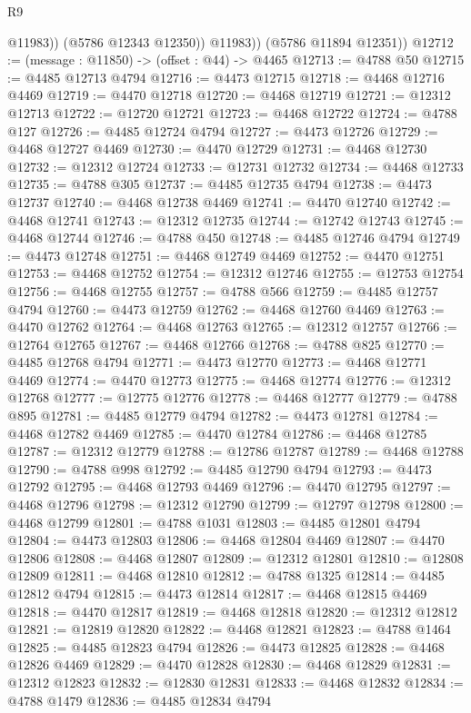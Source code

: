 \begin{lexlean}{R9}
\begin{coremodule}
                @11983))
            (@5786 @12343 @12350))
          @11983))
      (@5786 @11894 @12351))
@12712 := (message : @11850) -> (offset : @44) -> @4465
@12713 := @4788 @50
@12715 := @4485 @12713 @4794
@12716 := @4473 @12715
@12718 := @4468 @12716 @4469
@12719 := @4470 @12718
@12720 := @4468 @12719
@12721 := @12312 @12713
@12722 := @12720 @12721
@12723 := @4468 @12722
@12724 := @4788 @127
@12726 := @4485 @12724 @4794
@12727 := @4473 @12726
@12729 := @4468 @12727 @4469
@12730 := @4470 @12729
@12731 := @4468 @12730
@12732 := @12312 @12724
@12733 := @12731 @12732
@12734 := @4468 @12733
@12735 := @4788 @305
@12737 := @4485 @12735 @4794
@12738 := @4473 @12737
@12740 := @4468 @12738 @4469
@12741 := @4470 @12740
@12742 := @4468 @12741
@12743 := @12312 @12735
@12744 := @12742 @12743
@12745 := @4468 @12744
@12746 := @4788 @450
@12748 := @4485 @12746 @4794
@12749 := @4473 @12748
@12751 := @4468 @12749 @4469
@12752 := @4470 @12751
@12753 := @4468 @12752
@12754 := @12312 @12746
@12755 := @12753 @12754
@12756 := @4468 @12755
@12757 := @4788 @566
@12759 := @4485 @12757 @4794
@12760 := @4473 @12759
@12762 := @4468 @12760 @4469
@12763 := @4470 @12762
@12764 := @4468 @12763
@12765 := @12312 @12757
@12766 := @12764 @12765
@12767 := @4468 @12766
@12768 := @4788 @825
@12770 := @4485 @12768 @4794
@12771 := @4473 @12770
@12773 := @4468 @12771 @4469
@12774 := @4470 @12773
@12775 := @4468 @12774
@12776 := @12312 @12768
@12777 := @12775 @12776
@12778 := @4468 @12777
@12779 := @4788 @895
@12781 := @4485 @12779 @4794
@12782 := @4473 @12781
@12784 := @4468 @12782 @4469
@12785 := @4470 @12784
@12786 := @4468 @12785
@12787 := @12312 @12779
@12788 := @12786 @12787
@12789 := @4468 @12788
@12790 := @4788 @998
@12792 := @4485 @12790 @4794
@12793 := @4473 @12792
@12795 := @4468 @12793 @4469
@12796 := @4470 @12795
@12797 := @4468 @12796
@12798 := @12312 @12790
@12799 := @12797 @12798
@12800 := @4468 @12799
@12801 := @4788 @1031
@12803 := @4485 @12801 @4794
@12804 := @4473 @12803
@12806 := @4468 @12804 @4469
@12807 := @4470 @12806
@12808 := @4468 @12807
@12809 := @12312 @12801
@12810 := @12808 @12809
@12811 := @4468 @12810
@12812 := @4788 @1325
@12814 := @4485 @12812 @4794
@12815 := @4473 @12814
@12817 := @4468 @12815 @4469
@12818 := @4470 @12817
@12819 := @4468 @12818
@12820 := @12312 @12812
@12821 := @12819 @12820
@12822 := @4468 @12821
@12823 := @4788 @1464
@12825 := @4485 @12823 @4794
@12826 := @4473 @12825
@12828 := @4468 @12826 @4469
@12829 := @4470 @12828
@12830 := @4468 @12829
@12831 := @12312 @12823
@12832 := @12830 @12831
@12833 := @4468 @12832
@12834 := @4788 @1479
@12836 := @4485 @12834 @4794

\end{coremodule}
\end{lexlean}

